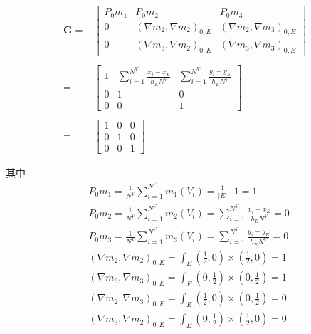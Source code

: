 \begin{equation*}
\begin{aligned}
\mathbf G = &
\begin{bmatrix}
P_0 m_1 & P_0m_2 &  P_0 m_{3} \\
0 & (\nabla m_2, \nabla m_2)_{0,E} &  (\nabla m_2, \nabla m_{3})_{0,E}\\
0 & (\nabla m_{3}, \nabla m_2)_{0,E} &  (\nabla m_{3}, \nabla m_{3})_{0,E}
\end{bmatrix}\\
\\
= & \begin{bmatrix}
1 & \sum_{i=1}^{N^V} \frac{x_i - x_{E}}{h_EN^V} & \sum_{i=1}^{N^V} \frac{y_i - y_{E}}{h_EN^V}\\
0 & 1 & 0\\
0 & 0 & 1
\end{bmatrix}\\
\\
=& \begin{bmatrix}
1 & 0 & 0\\
0 & 1 & 0\\
0 & 0 & 1
\end{bmatrix}
\end{aligned}
\end{equation*}

其中\\
\begin{equation*}
\begin{aligned}
& P_0m_1 = \frac{1}{N^V}\sum_{i = 1}^{N^V}m_1(V_i) = \frac{1}{|E|}\cdot 1 = 1 \\
& P_0m_2 = \frac{1}{N^V}\sum_{i = 1}^{N^V}m_2(V_i) = \sum_{i=1}^{N^V} \frac{x_i - x_{E}}{h_EN^V} = 0 \\
& P_0m_3 = \frac{1}{N^V}\sum_{i = 1}^{N^V}m_3(V_i) = \sum_{i=1}^{N^V} \frac{y_i - y_{E}}{h_EN^V} = 0 \\
& (\nabla m_2,\nabla m_2)_{0,E} = \int_{E} (\frac{1}{2},0)\times(\frac{1}{2},0) = 1 \\
& (\nabla m_3,\nabla m_3)_{0,E} = \int_{E} (0, \frac{1}{2})\times(0, \frac{1}{2}) = 1 \\
& (\nabla m_2,\nabla m_3)_{0,E} = \int_{E} (\frac{1}{2},0)\times(0,\frac{1}{2}) = 0 \\
& (\nabla m_3,\nabla m_2)_{0,E} = \int_{E} (0,\frac{1}{2})\times(\frac{1}{2},0) = 0 \\
\end{aligned}
\end{equation*}

